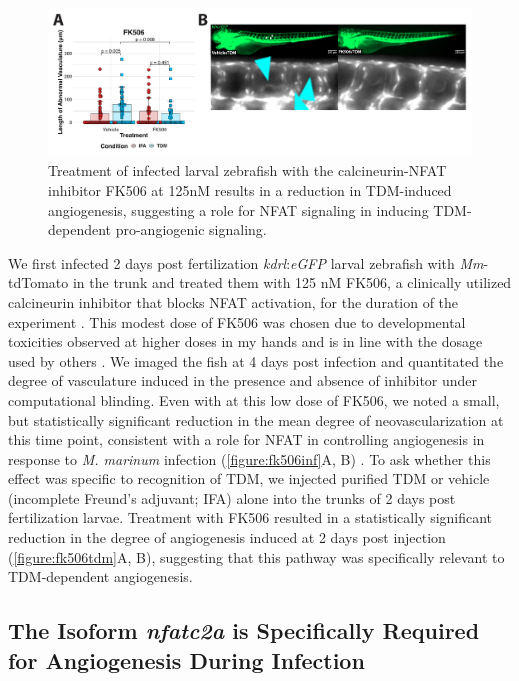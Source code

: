 \begin{figure}
\centering
\includegraphics[width=\textwidth]{images/fk506tdm.pdf}
\caption{Treatment of infected larval zebrafish with the calcineurin-NFAT inhibitor FK506 at 125nM results in a reduction in TDM-induced angiogenesis, suggesting a role for NFAT signaling in inducing TDM-dependent pro-angiogenic signaling.}
\label{figure:fk506tdm}
\end{figure}

We first infected 2 days post fertilization \textit{kdrl}:\textit{eGFP} larval zebrafish with \textit{Mm}-tdTomato in the trunk and treated them with 125 nM FK506, a clinically utilized calcineurin inhibitor that blocks NFAT activation, for the duration of the experiment \citep{Ellis1995}. This modest dose of FK506 was chosen due to developmental toxicities observed at higher doses in my hands and is in line with the dosage used by others \citep{Kujawski2014}. We imaged the fish at 4 days post infection and quantitated the degree of vasculature induced in the presence and absence of inhibitor under computational blinding. Even with at this low dose of FK506, we noted a small, but statistically significant reduction in the mean degree of neovascularization at this time point, consistent with a role for NFAT in controlling angiogenesis in response to \textit{M. marinum} infection (\autoref{figure:fk506inf}A, B) \citep{Kujawski2014}. To ask whether this effect was specific to recognition of TDM, we injected purified TDM or vehicle (incomplete Freund's adjuvant; IFA) alone into the trunks of 2 days post fertilization larvae. Treatment with FK506 resulted in a statistically significant reduction in the degree of angiogenesis induced at 2 days post injection (\autoref{figure:fk506tdm}A, B), suggesting that this pathway was specifically relevant to TDM-dependent angiogenesis.

\subsection{The Isoform \textit{nfatc2a} is Specifically Required for Angiogenesis During Infection}

